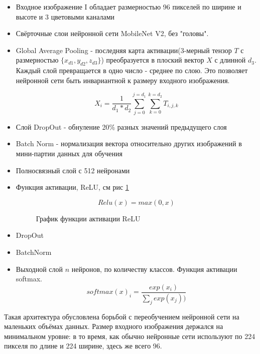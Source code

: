 \begin{itemize}
    \item Входное изображение I обладает размерностью 96 пикселей по ширине и высоте и 3 цветовыми каналами
    \item Свёрточные слои нейронной сети MobileNet V2\cite{mobilenet}, без "головы".
    \item Global Average Pooling - последняя карта активации(3-мерный тензор $T$ с размерностью $\{x_{d1}, y_{d2}, z_{d3}\}$) преобразуется в плоский вектор $X$ с длинной $d_3$. Каждый слой превращается в одно число - среднее по слою. Это позволяет нейронной сети быть инвариантной к размеру входного изображения.
    
    \[ X_i = \dfrac{1}{d_1*d_2}\sum_{j=0}^{j=d_1}\sum_{k=0}^{k=d_2}T_{i,j,k} \]
    
    \item Слой DropOut\cite{dropout} - обнуление 20\% разных значений предыдущего слоя
    \item Batch Norm\cite{batchnorm} - нормализация вектора относительно других изображений в мини-партии данных для обучения
    \item Полносвязный слой с 512 нейронами
    \item Функция активации, ReLU, см рис \ref{fig:relu}
    
    \[ Relu(x) = max(0,x) \]
    
    
    \begin{figure}
        \centering
        \caption{График функции активации ReLU}
        \label{fig:relu}
    \end{figure}
    
    \item DropOut
    \item BatchNorm
    \item Выходной слой $n$ нейронов, по количеству классов. Функция активации softmax. 
    \[softmax(x)_i = \frac{exp(x_i)}{\sum_{j}^{ }exp(x_j))}\]
\end{itemize}

Такая архитектура обусловлена борьбой с переобучением нейронной сети на маленьких объёмах данных. Размер входного изображения держался на минимальном уровне: в то время, как обычно нейронные сети используют по 224 пикселя по длине и 224 ширине, здесь же всего 96. 

